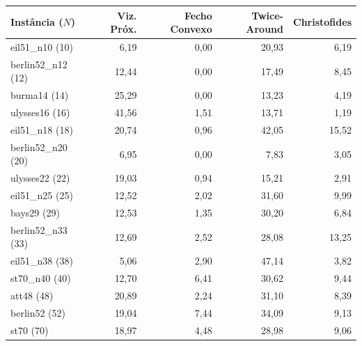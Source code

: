 \begin{tabular}{lrrrr}
\toprule
Instância ($N$) & Viz. Próx. & Fecho Convexo & Twice-Around & Christofides \\
\midrule
eil51\_n10 (10) & 6,19 & 0,00 & 20,93 & 6,19 \\
berlin52\_n12 (12) & 12,44 & 0,00 & 17,49 & 8,45 \\
burma14 (14) & 25,29 & 0,00 & 13,23 & 4,19 \\
ulysses16 (16) & 41,56 & 1,51 & 13,71 & 1,19 \\
eil51\_n18 (18) & 20,74 & 0,96 & 42,05 & 15,52 \\
berlin52\_n20 (20) & 6,95 & 0,00 & 7,83 & 3,05 \\
ulysses22 (22) & 19,03 & 0,94 & 15,21 & 2,91 \\
eil51\_n25 (25) & 12,52 & 2,02 & 31,60 & 9,99 \\
bays29 (29) & 12,53 & 1,35 & 30,20 & 6,84 \\
berlin52\_n33 (33) & 12,69 & 2,52 & 28,08 & 13,25 \\
eil51\_n38 (38) & 5,06 & 2,90 & 47,14 & 3,82 \\
st70\_n40 (40) & 12,70 & 6,41 & 30,62 & 9,44 \\
att48 (48) & 20,89 & 2,24 & 31,10 & 8,39 \\
berlin52 (52) & 19,04 & 7,44 & 34,09 & 9,13 \\
st70 (70) & 18,97 & 4,48 & 28,98 & 9,06 \\
\bottomrule
\end{tabular}

